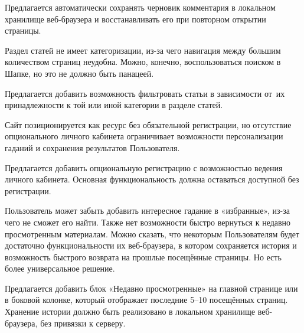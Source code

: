 Предлагается автоматически сохранять черновик комментария в локальном хранилище веб-браузера и восстанавливать его при повторном открытии страницы.


Раздел статей не имеет категоризации, из-за чего навигация между большим количеством страниц неудобна. Можно, конечно, воспользоваться поиском в Шапке, но это не должно быть панацеей.

Предлагается добавить возможность фильтровать статьи в зависимости от~их принадлежности к той или иной категории в разделе статей.


Сайт позиционируется как ресурс без обязательной регистрации, но отсутствие опционального личного кабинета ограничивает возможности персонализации гаданий и сохранения результатов Пользователя.

Предлагается добавить опциональную регистрацию с возможностью ведения личного кабинета. Основная функциональность должна оставаться доступной без регистрации.


Пользователь может забыть добавить интересное гадание в «избранные», из-за чего не сможет его найти. Также нет возможности быстро вернуться к недавно просмотренным материалам. Можно сказать, что некоторым Пользователям будет достаточно функциональности их веб-браузера, в котором сохраняется история и возможность быстрого возврата на прошлые посещённые страницы. Но есть более универсальное решение. 

Предлагается добавить блок «Недавно просмотренные» на главной странице или в боковой колонке, который отображает последние 5–10 посещённых страниц. Хранение истории должно быть реализовано в локальном хранилище веб-браузера, без привязки к серверу.